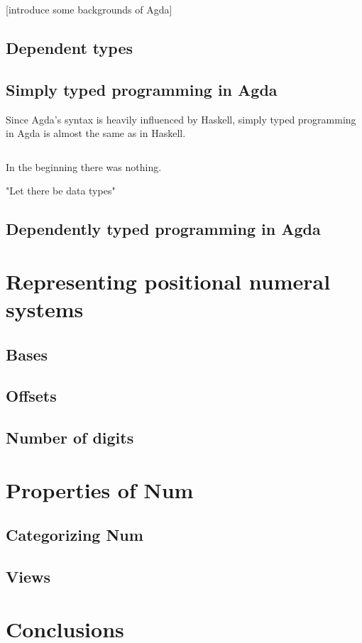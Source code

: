 \documentclass[12pt, a4paper]{article}
\begin{document}
[introduce some backgrounds of Agda]

\subsection{Dependent types}

\subsection{Simply typed programming in Agda}


Since Agda's syntax is heavily influenced by Haskell, simply typed programming
in Agda is almost the same as in Haskell.

\begin{lstlisting}
\end{lstlisting}




In the beginning there was nothing.

"Let there be data types"



\subsection{Dependently typed programming in Agda}


\section{Representing positional numeral systems}\label{representation}

\subsection{Bases}
\subsection{Offsets}
\subsection{Number of digits}

\section{Properties of Num}
\subsection{Categorizing Num}
\subsection{Views}

\section{Conclusions}\label{conclusions}



\end{document}
